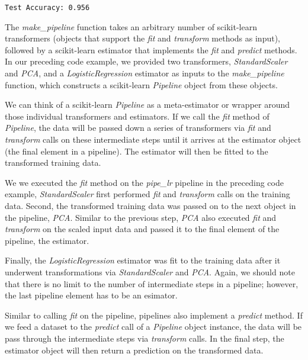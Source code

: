 \documentclass[11pt]{article}
\begin{document}
    \begin{Verbatim}[commandchars=\\\{\}]
Test Accuracy: 0.956

    \end{Verbatim}

    The \emph{make\_pipeline} function takes an arbitrary number of
scikit-learn transformers (objects that support the \emph{fit} and
\emph{transform} methods as input), followed by a scikit-learn estimator
that implements the \emph{fit} and \emph{predict} methods. In our
preceding code example, we provided two transformers,
\emph{StandardScaler} and \emph{PCA}, and a \emph{LogisticRegression}
estimator as inputs to the \emph{make\_pipeline} function, which
constructs a scikit-learn \emph{Pipeline} object from these objects.

We can think of a scikit-learn \emph{Pipeline} as a meta-estimator or
wrapper around those individual transformers and estimators. If we call
the \emph{fit} method of \emph{Pipeline}, the data will be passed down a
series of transformers via \emph{fit} and \emph{transform} calls on
these intermediate steps until it arrives at the estimator object (the
final element in a pipeline). The estimator will then be fitted to the
transformed training data.

We we executed the \emph{fit} method on the \emph{pipe\_lr} pipeline in
the preceding code example, \emph{StandardScaler} first performed
\emph{fit} and \emph{transform} calls on the training data. Second, the
transformed training data was passed on to the next object in the
pipeline, \emph{PCA}. Similar to the previous step, \emph{PCA} also
executed \emph{fit} and \emph{transform} on the scaled input data and
passed it to the final element of the pipeline, the estimator.

Finally, the \emph{LogisticRegression} estimator was fit to the training
data after it underwent transformations via \emph{StandardScaler} and
\emph{PCA}. Again, we should note that there is no limit to the number
of intermediate steps in a pipeline; however, the last pipeline element
has to be an esimator.

Similar to calling \emph{fit} on the pipeline, pipelines also implement
a \emph{predict} method. If we feed a dataset to the \emph{predict} call
of a \emph{Pipeline} object instance, the data will be pass through the
intermediate steps via \emph{transform} calls. In the final step, the
estimator object will then return a prediction on the transformed data.
\end{document}
